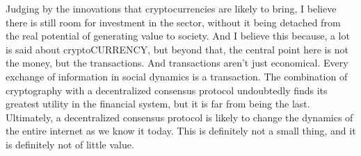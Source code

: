 Judging by the innovations that cryptocurrencies are likely to bring, I believe there is still room for investment in the sector, without it being detached from the real potential of generating value to society. And I believe this because, a lot is said about cryptoCURRENCY, but beyond that, the central point here is not the money, but the transactions. And transactions aren't just economical. Every exchange of information in social dynamics is a transaction. The combination of cryptography with a decentralized consensus protocol undoubtedly finds its greatest utility in the financial system, but it is far from being the last. Ultimately, a decentralized consensus protocol is likely to change the dynamics of the entire internet as we know it today. This is definitely not a small thing, and it is definitely not of little value.
